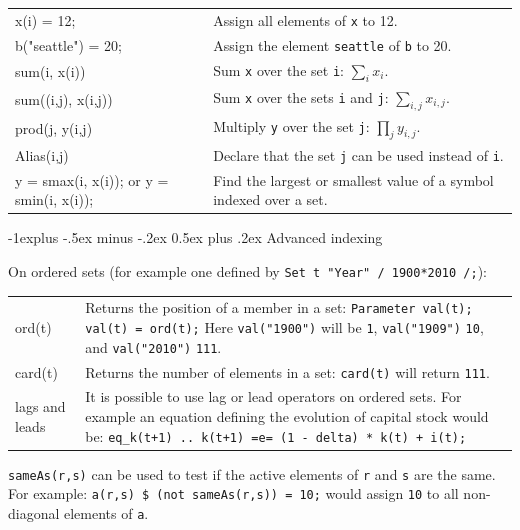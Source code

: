 \documentclass[10pt,landscape,a4paper]{article}
\makeatletter
\renewcommand{\subsection}{\@startsection{subsection}{2}{0mm}%
                                {-1explus -.5ex minus -.2ex}%
                                {0.5ex plus .2ex}%
                                {\normalfont\normalsize\bfseries}}
\makeatother
\begin{document}
\begin{multicols}{2}
\begin{tabularx}{\columnwidth}{@{}>{\ttfamily}lX@{}}
x(i) = 12; & Assign all elements of \texttt{x} to 12.\\
b("seattle") = 20; & Assign the element \texttt{seattle} of \texttt{b} to 20.\\
sum(i, x(i)) & Sum \texttt{x} over the set \texttt{i}: $\sum_{i}x_{i}$.\\
sum((i,j), x(i,j)) & Sum \texttt{x} over the sets \texttt{i} and \texttt{j}: $\sum_{i,j}x_{i,j}$.\\
prod(j, y(i,j) & Multiply \texttt{y} over the set \texttt{j}:
$\prod_{j}y_{i,j}$.\\
Alias(i,j) & Declare that the set \texttt{j} can be used instead of
\texttt{i}.\\
y = smax(i, x(i)); \textrm{or} y = smin(i, x(i)); & Find the largest or smallest
value of a symbol indexed over a set.
\end{tabularx}

\subsection{Advanced indexing}

On ordered sets (for example one defined by \texttt{Set t "Year" / 1900*2010 /;}):
\begin{tabularx}{\columnwidth}{@{}>{\ttfamily}l>{\raggedright\arraybackslash}X@{}}
ord(t)& Returns the position of a member in a set:\linebreak{}
\texttt{Parameter val(t);}\linebreak{}
\texttt{val(t) = ord(t);}\linebreak{}
Here \texttt{val("1900")} will be \texttt{1}, \texttt{val("1909")} \texttt{10}, and \texttt{val("2010")} \texttt{111}.\\
card(t) & Returns the number of elements in a set: \texttt{card(t)} will return \texttt{111}.\\
\textrm{lags and leads} & It is possible to use lag or lead operators on ordered sets. For example an equation defining the evolution of capital stock would
be:\linebreak{}
\texttt{eq\_k(t+1) .. k(t+1) =e= (1 - delta) * k(t) + i(t);}
\end{tabularx}

\texttt{sameAs(r,s)} can be used to test if the active elements of \texttt{r} and \texttt{s} are the same. For example: \texttt{a(r,s) \$ (not sameAs(r,s)) = 10;} would assign \texttt{10} to all non-diagonal elements of \texttt{a}.


\end{multicols}
\end{document}
